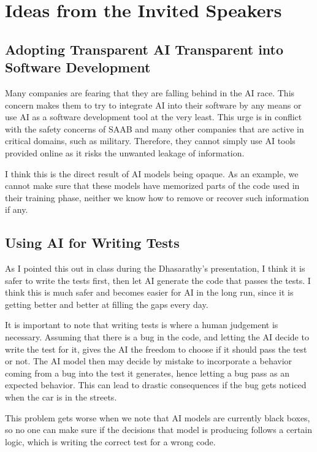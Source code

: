 \section{Ideas from the Invited Speakers}

\subsection{Adopting Transparent AI Transparent into Software Development}
Many companies are fearing that they are falling behind in the AI race. 
This concern makes them to try to integrate AI into their software by any means or use AI as a software development tool at the very least.
This urge is in conflict with the safety concerns of SAAB and many other companies that are active in critical domains, such as military. Therefore, they cannot simply use AI tools provided online as it risks the unwanted leakage of information.



I think this is the direct result of AI models being opaque. 
As an example, we cannot make sure that these models have memorized parts of the code used in their training phase, neither we know how to remove or recover such information if any.

\subsection{Using AI for Writing Tests}
As I pointed this out in class during the Dhasarathy's presentation, I think it is safer to write the tests first, then let AI generate the code that passes the tests. 
I think this is much safer and becomes easier for AI in the long run, since it is getting better and better at filling the gaps every day.



It is important to note that writing tests is where a human judgement is necessary.
Assuming that there is a bug in the code, and letting the AI decide to write the test for it, gives the AI the freedom to choose if it should pass the test or not.
The AI model then may decide by mistake to incorporate a behavior coming from a bug into the test it generates, hence letting a bug pass as an expected behavior. 
This can lead to drastic consequences if the bug gets noticed when the car is in the streets.



This problem gets worse when we note that AI models are currently black boxes, so no one can make sure if the decisions that model is producing follows a certain logic, which is writing the correct test for a wrong code.